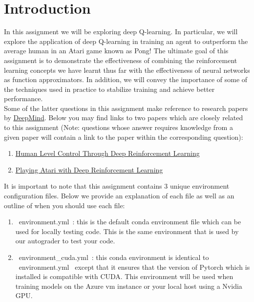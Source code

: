 \section{Introduction}\label{intro}

In this assignment we will be exploring deep Q-learning. In particular, we will explore the application of deep Q-learning in training an agent to outperform the average human in an Atari game known as Pong! The ultimate goal of this assignment is to demonstrate the effectiveness of combining the reinforcement learning concepts we have learnt thus far with the effectiveness of neural networks as function approximators. In addition, we will convey the importance of some of the techniques used in practice to stabilize training and achieve better performance. \\

Some of the latter questions in this assignment make reference to research papers by \href{https://deepmind.com/}{DeepMind}. Below you may find links to two papers which are closely related to this assignment (Note: questions whose answer requires knowledge from a given paper will contain a link to  the paper within the corresponding question):
\begin{enumerate}
  \item \href{https://storage.googleapis.com/deepmind-media/dqn/DQNNaturePaper.pdf}{Human Level Control Through Deep Reinforcement Learning}
  \item \href{https://arxiv.org/pdf/1312.5602v1.pdf}{Playing Atari with Deep Reinforcement Learning}
\end{enumerate}

  It is important to note that this assignment contains 3 unique environment configuration files. Below we provide an explanation of each file as well as an outline of when you should use each file:

  \begin{enumerate}
    \item ~environment.yml~: this is the default conda environment file which can be used for locally testing code. This is the same environment that is used by our autograder to test your code.

    \item ~environment_cuda.yml~: this conda environment is identical to ~environment.yml~ except that it ensures that the version of Pytorch which is installed is compatible with CUDA. This environment will be used when training models on the Azure vm instance or your local host using a Nvidia GPU.
  \end{enumerate}




